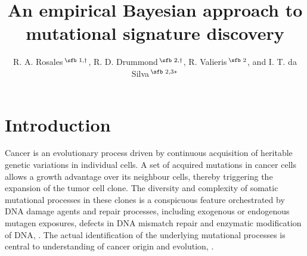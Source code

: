 \documentclass{bioinfo}
\begin{document}
\title[empirical Bayesian NMF]{An empirical Bayesian approach to
  mutational signature discovery}
\author[Rosales, R. A. and Drummond, R. D.~\textit{et~al}.]{
    R. A. Rosales\,$^{\text{\sfb 1,}\dagger}$, 
    R. D. Drummond\,$^{\text{\sfb 2,}\dagger}$, 
    R. Valieris\,$^{\text{\sfb 2}}$,  and
    I. T. da Silva\,$^{\text{\sfb 2,3}*}$} 
\address{%
   $^{\text{\sf 1}}$Departamento de Computa\c{c}\~ao e
   Matem\'atica, Universidade de S\~ao Paulo, 14040-901 SP, Brazil\\ 
   $^{\text{\sf 2}}$Laboratory of Bioinformatics and Computational 
   Biology, CIPE/A.C. Camargo Cancer Center, S\~ao Paulo  01509-010, 
   Brazil\\
   $^{\text{\sf 3}}$Laboratory of Molecular Immunology, The
   Rockefeller University, New York, NY 10065, USA\\[1em]
   {\normalsize $^{\dagger}$The authors wish it to be known
     that, in their opinion, the first two authors should be regarded
     as joint First Authors} 
}
\maketitle
\section{Introduction}
Cancer is an evolutionary process driven by continuous acquisition of
heritable genetic variations in individual cells. A set of acquired
mutations in cancer cells allows a growth advantage over its neighbour
cells, thereby triggering the expansion of the tumor cell clone. The
diversity and complexity of somatic mutational processes in these
clones is a conspicuous feature orchestrated by DNA damage agents and
repair processes, including exogenous or endogenous mutagen exposures,
defects in DNA mismatch repair and enzymatic modification of DNA,
\cite{RG}. The actual identification of the underlying mutational
processes is central to understanding of cancer origin and evolution,
\citealp{RG, AS, HEN}.
\end{document}
